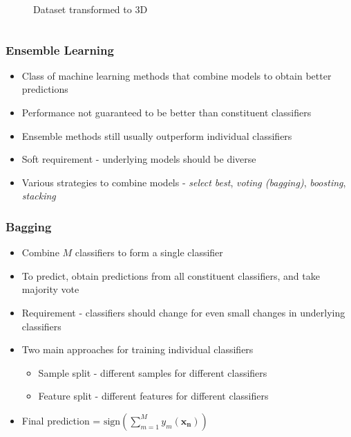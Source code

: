 \documentclass{beamer}
\begin{document}
\begin{frame}
\begin{columns}
\begin{column}{0.4\textwidth}
\begin{figure}
                    \caption{Dataset transformed to 3D}
                \end{figure}
            \end{column}
        \end{columns}
    \end{frame}
    
    \begin{frame}
        \frametitle{Ensemble Learning}
        \begin{itemize}
            \item{Class of machine learning methods that combine models to obtain better predictions}
            \item{Performance not guaranteed to be better than constituent classifiers}
            \item{Ensemble methods still usually outperform individual classifiers}
            \item{Soft requirement - underlying models should be diverse}
            \item{Various strategies to combine models - \emph{select best}, \emph{voting (bagging)}, \emph{boosting}, \emph{stacking}}
        \end{itemize}
    \end{frame}
    
    \begin{frame}
        \frametitle{Bagging}
        \begin{itemize}
            \item{Combine $M$ classifiers to form a single classifier}
            \item{To predict, obtain predictions from all constituent classifiers, and take majority vote}
            \item{Requirement - classifiers should change for even small changes in underlying classifiers}
            \item{
            Two main approaches for training individual classifiers
            \begin{itemize}
                \item{Sample split - different samples for different classifiers}
                \item{Feature split - different features for different classifiers}
            \end{itemize}
            }
            \item{Final prediction = $\mathrm{sign}(\displaystyle \sum_{m = 1}^M y_m(\mathbf{x_n}))$}
        \end{itemize}
    \end{frame}
    
\end{document}

